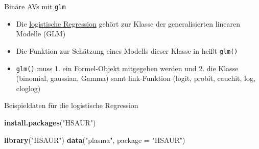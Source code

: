 \documentclass[ignorenonframetext,]{beamer}
\newenvironment{Shaded}{}{}
\newcommand{\KeywordTok}[1]{\textcolor[rgb]{0.00,0.44,0.13}{\textbf{{#1}}}}
\newcommand{\DataTypeTok}[1]{\textcolor[rgb]{0.56,0.13,0.00}{{#1}}}
\newcommand{\StringTok}[1]{\textcolor[rgb]{0.25,0.44,0.63}{{#1}}}
\newcommand{\NormalTok}[1]{{#1}}
\providecommand{\tightlist}{%
\setlength{\itemsep}{0pt}\setlength{\parskip}{0pt}}
\begin{document}
\begin{frame}[fragile]{Binäre AVs mit \texttt{glm}}

\begin{itemize}
\tightlist
\item
  Die \href{http://data.princeton.edu/R/glms.html}{logistische
  Regression} gehört zur Klasse der generalisierten linearen Modelle
  (GLM)
\item
  Die Funktion zur Schätzung eines Modells dieser Klasse in heißt
  \texttt{glm()}
\item
  \texttt{glm()} muss 1. ein Formel-Objekt mitgegeben werden und 2. die
  Klasse (binomial, gaussian, Gamma) samt link-Funktion (logit, probit,
  cauchit, log, cloglog)
\end{itemize}

\end{frame}

\begin{frame}[fragile]{Beispieldaten für die logistische Regression}

\begin{Shaded}
\begin{Highlighting}[]
\KeywordTok{install.packages}\NormalTok{(}\StringTok{"HSAUR"}\NormalTok{)}
\end{Highlighting}
\end{Shaded}

\begin{Shaded}
\begin{Highlighting}[]
\KeywordTok{library}\NormalTok{(}\StringTok{"HSAUR"}\NormalTok{)}
\KeywordTok{data}\NormalTok{(}\StringTok{"plasma"}\NormalTok{, }\DataTypeTok{package =} \StringTok{"HSAUR"}\NormalTok{)}
\end{Highlighting}
\end{Shaded}

\end{frame}
\end{document}
